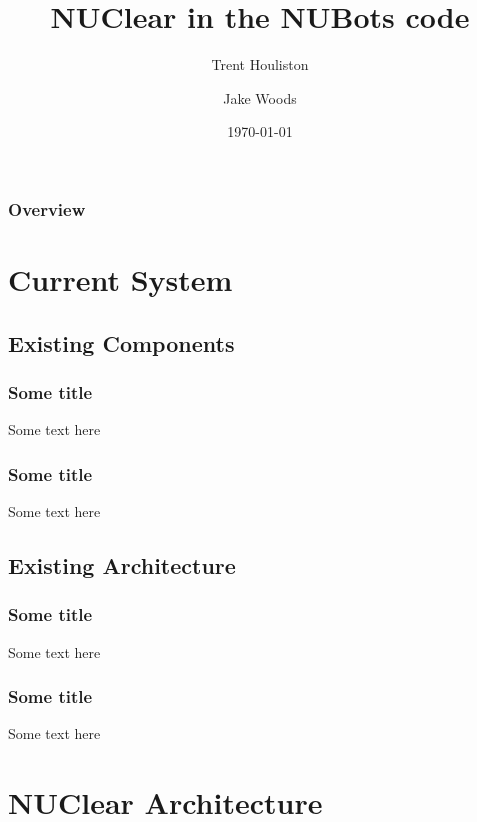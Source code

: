 \documentclass{beamer}
\title[Short title]{NUClear in the NUBots code}
\author{
	Trent Houliston \and Jake Woods
}
\institute[UoN]
{
	University of Newcastle \\ %
	\medskip
	\textit{Trent.Houliston@uon.edu.au, Jake.f.woods@gmail.com} %
}
\date{\today}
\begin{document}
\begin{frame}
	\titlepage %
\end{frame}


\begin{frame}
	\frametitle{Overview}
	\tableofcontents
\end{frame}

\section{Current System}
\subsection{Existing Components}
	\begin{frame}
		\frametitle{Some title}
		Some text here
	\end{frame}
	
	\begin{frame}
		\frametitle{Some title}
		Some text here
	\end{frame}

\subsection{Existing Architecture}
	\begin{frame}
		\frametitle{Some title}
		Some text here
	\end{frame}
	
	\begin{frame}
		\frametitle{Some title}
		Some text here
	\end{frame}

\section{NUClear Architecture}
\end{document}
